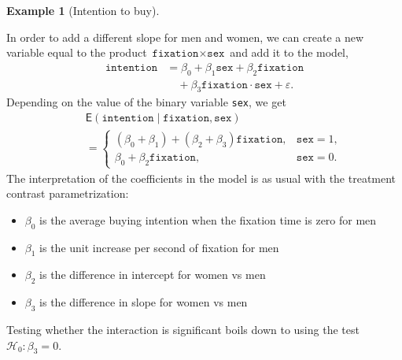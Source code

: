 \documentclass[
  11pt,
  letterpaper,
]{scrbook}
\newenvironment{Shaded}{\begin{snugshade}}{\end{snugshade}}
\newcommand{\AttributeTok}[1]{\textcolor[rgb]{0.40,0.45,0.13}{#1}}
\newcommand{\CommentTok}[1]{\textcolor[rgb]{0.37,0.37,0.37}{#1}}
\newcommand{\FunctionTok}[1]{\textcolor[rgb]{0.28,0.35,0.67}{#1}}
\newcommand{\NormalTok}[1]{\textcolor[rgb]{0.00,0.23,0.31}{#1}}
\newcommand{\OtherTok}[1]{\textcolor[rgb]{0.00,0.23,0.31}{#1}}
\newcommand{\SpecialCharTok}[1]{\textcolor[rgb]{0.37,0.37,0.37}{#1}}
\newcommand{\StringTok}[1]{\textcolor[rgb]{0.13,0.47,0.30}{#1}}
\providecommand{\tightlist}{%
  \setlength{\itemsep}{0pt}\setlength{\parskip}{0pt}}\usepackage{longtable,booktabs,array}
\theoremstyle{definition}
\theoremstyle{definition}
\newtheorem{example}{Example}[chapter]
\theoremstyle{plain}
\theoremstyle{plain}
\theoremstyle{remark}
\begin{document}
\begin{example}[Intention to
buy]
\begin{figure}[ht!]
\end{figure}%

In order to add a different slope for men and women, we can create a new
variable equal to the product \(\texttt{fixation}\times\texttt{sex}\)
and add it to the model, \begin{align*}
\texttt{intention} &= \beta_0 + \beta_1 \texttt{sex} + \beta_2\texttt{fixation} \\&\quad + \beta_3 \texttt{fixation}\cdot \texttt{sex} + \varepsilon.
\end{align*} Depending on the value of the binary variable \texttt{sex},
we get \begin{align*}
&\mathsf{E}(\texttt{intention} \mid \texttt{fixation}, \texttt{sex}) \\\quad&= 
\begin{cases}
(\beta_0 + \beta_1) + (\beta_2 + \beta_3)\texttt{fixation}, & \texttt{sex}=1,\\
  \beta_0 + \beta_2 \texttt{fixation}, & \texttt{sex}=0.
\end{cases}
\end{align*} The interpretation of the coefficients in the model is as
usual with the treatment contrast parametrization:

\begin{itemize}
\tightlist
\item
  \(\beta_0\) is the average buying intention when the fixation time is
  zero for men
\item
  \(\beta_1\) is the unit increase per second of fixation for men
\item
  \(\beta_2\) is the difference in intercept for women vs men
\item
  \(\beta_3\) is the difference in slope for women vs men
\end{itemize}

Testing whether the interaction is significant boils down to using the
test \(\mathscr{H}_0: \beta_3=0\).

\begin{Shaded}
\end{Shaded}


\end{example}
\end{document}
